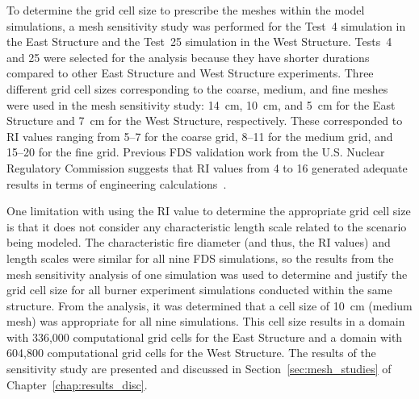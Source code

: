 To determine the grid cell size to prescribe the meshes within the model simulations, a mesh sensitivity study was performed for the Test~4 simulation in the East Structure and the Test~25 simulation in the West Structure. Tests~4 and 25 were selected for the analysis because they have shorter durations compared to other East Structure and West Structure experiments. Three different grid cell sizes corresponding to the coarse, medium, and fine meshes were used in the mesh sensitivity study: 14~cm, 10~cm, and 5~cm for the East Structure and 7~cm for the West Structure, respectively. These corresponded to RI values ranging from 5--7 for the coarse grid, 8--11 for the medium grid, and 15--20 for the fine grid. Previous FDS validation work from the U.S. Nuclear Regulatory Commission suggests that RI values from 4 to 16 generated adequate results in terms of engineering calculations~\cite{NUREG_1824}.

One limitation with using the RI value to determine the appropriate grid cell size is that it does not consider any characteristic length scale related to the scenario being modeled. The characteristic fire diameter (and thus, the RI values) and length scales were similar for all nine FDS simulations, so the results from the mesh sensitivity analysis of one simulation was used to determine and justify the grid cell size for all burner experiment simulations conducted within the same structure. From the analysis, it was determined that a cell size of 10~cm (medium mesh) was appropriate for all nine simulations. This cell size results in a domain with 336,000 computational grid cells for the East Structure and a domain with 604,800 computational grid cells for the West Structure. The results of the sensitivity study are presented and discussed in Section~\ref{sec:mesh_studies} of Chapter~\ref{chap:results_disc}.

